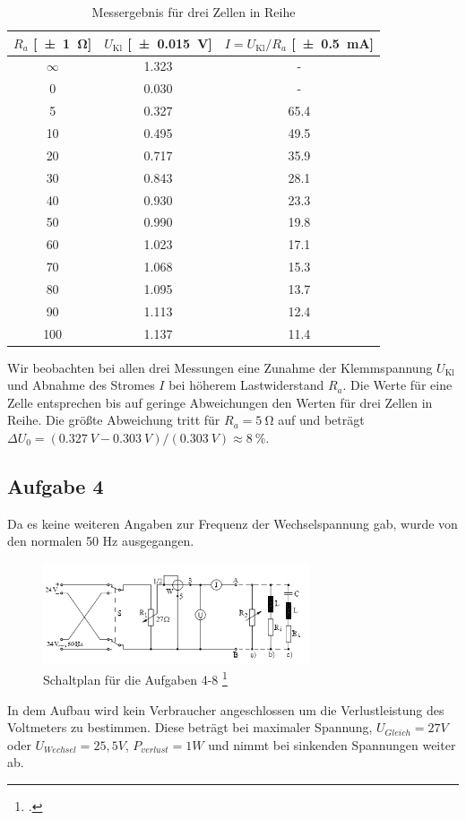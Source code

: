 \begin{table}[H]
  \centering
  \begin{tabular}{c c c} \toprule
    $R_a$ [\SI{\pm1}{\ohm}] & $U_{\text{Kl}}$ [\SI{\pm .015}{V}] & $I=U_{\text{Kl}}/R_a$ [\SI{\pm .5}{mA}] \\ \midrule
    $\infty$ & \num{1.323} & - \\
    0 & \num{0.030} & - \\
    5 & \num{0.327} & \num{65.4} \\
    10 & \num{.495} & \num{49.5} \\
    20 & \num{.717} & \num{35.9} \\
    30 & \num{.843} & \num{28.1} \\
    40 & \num{.930} & \num{23.3} \\
    50 & \num{.990} & \num{19.8} \\
    60 & \num{1.023} & \num{17.1} \\
    70 & \num{1.068} & \num{15.3} \\
    80 & \num{1.095} & \num{13.7} \\
    90 & \num{1.113} & \num{12.4} \\
    100 & \num{1.137} & \num{11.4} \\ \bottomrule
  \end{tabular}
  \caption{Messergebnis für drei Zellen in Reihe}
  \label{tab:einezelle}
\end{table}
Wir beobachten bei allen drei Messungen eine Zunahme der Klemmspannung $U_{\text{Kl}}$ und Abnahme des Stromes $I$ bei höherem Lastwiderstand $R_a$. Die Werte für eine Zelle entsprechen bis auf geringe Abweichungen den Werten für drei Zellen in Reihe. Die größte Abweichung tritt für $R_a=\SI{5}{\ohm}$ auf und beträgt $\Delta U_0=(\SI{0.327}{V}-\SI{0.303}{V})/(\SI{0.303}{V})\approx \SI{8}{\percent}$.

\subsection{Aufgabe 4}
Da es keine weiteren Angaben zur Frequenz der Wechselspannung gab, wurde von den normalen 50 Hz ausgegangen.
\begin{figure}[H] 
  \centering
	\includegraphics[width=0.7\textwidth]{Schaltplan.png}
	\caption{Schaltplan für die Aufgaben 4-8 \footcite{anleitung-ws2014}}
  \label{fig:kreisel1}
\end{figure}
In dem Aufbau wird kein Verbraucher angeschlossen um die Verlustleistung des Voltmeters zu bestimmen. Diese beträgt bei maximaler Spannung, $U_{Gleich}=27V$ oder $U_{Wechsel}=25,5V$, $P_{verlust}=1W$ und nimmt bei sinkenden Spannungen weiter ab.
